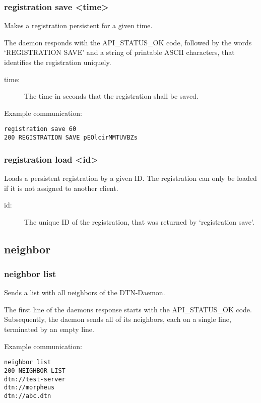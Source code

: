 \documentclass[12pt, a4paper]{scrartcl}
\begin{document}
\subsubsection*{registration save <time>}
Makes a registration persistent for a given time.

The daemon responds with the API\_STATUS\_OK code, followed by the words `REGISTRATION SAVE' and a string of printable ASCII characters, that identifies the registration uniquely.
\begin{description}
\item[time:] The time in seconds that the registration shall be saved.
\end{description}

Example communication:\\
\makebox[\textwidth]{\hrulefill}
\begin{verbatim}
registration save 60
200 REGISTRATION SAVE pEOlcirMMTUVBZs
\end{verbatim}
\makebox[\textwidth]{\hrulefill}
\subsubsection*{registration load <id>}
Loads a persistent registration by a given ID.
The registration can only be loaded if it is not assigned to another client.
\begin{description}
\item[id:] The unique ID of the registration, that was returned by `registration save'.
\end{description}
\subsection{neighbor}
\subsubsection*{neighbor list}
Sends a list with all neighbors of the DTN-Daemon.

The first line of the daemons response starts with the API\_STATUS\_OK code.
Subsequently, the daemon sends all of its neighbors, each on a single line, terminated by an empty line.

Example communication:\\
\makebox[\textwidth]{\hrulefill}
\begin{verbatim}
neighbor list
200 NEIGHBOR LIST
dtn://test-server
dtn://morpheus
dtn://abc.dtn

\end{verbatim}
\makebox[\textwidth]{\hrulefill}
\end{document}
